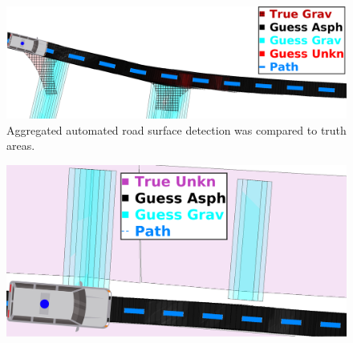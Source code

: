 \documentclass[numbered,pdftex]{ohio-etd}
\begin{document}
{{		\begin{figure}[H]
			\centering
			\includegraphics[width=0.95\linewidth]{Defense_Images/db1_conf_elim_auto_guess_mca}
			\caption[Aggregated Automated Road Surface Detection]{Aggregated automated road surface detection was compared to truth areas. }
			\label{fig:guess_grav_intersect}
		\end{figure}
		
		\begin{figure}[H]
			\centering
			\includegraphics[width=0.95\linewidth]{Defense_Images/db6_conf_filt_auto_guess_mca}
			\caption[Automated Road Surface False Positive]{}
			\label{fig:6range_guess_unkn_misclass}
		\end{figure}
		
}}
\end{document}
